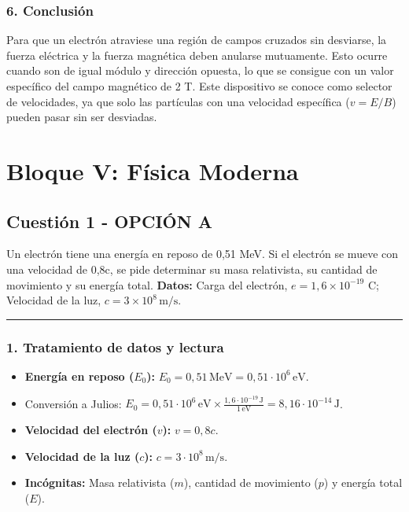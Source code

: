 \subsubsection*{6. Conclusión}
\begin{cajaconclusion}
Para que un electrón atraviese una región de campos cruzados sin desviarse, la fuerza eléctrica y la fuerza magnética deben anularse mutuamente. Esto ocurre cuando son de igual módulo y dirección opuesta, lo que se consigue con un valor específico del campo magnético de 2 T. Este dispositivo se conoce como selector de velocidades, ya que solo las partículas con una velocidad específica ($v=E/B$) pueden pasar sin ser desviadas.
\end{cajaconclusion}

\newpage

\section{Bloque V: Física Moderna}
\label{sec:moderna_2000_jun_ord}

\subsection{Cuestión 1 - OPCIÓN A}
\label{subsec:5A_2000_jun_ord}

\begin{cajaenunciado}
Un electrón tiene una energía en reposo de 0,51 MeV. Si el electrón se mueve con una velocidad de 0,8c, se pide determinar su masa relativista, su cantidad de movimiento y su energía total.
\textbf{Datos:} Carga del electrón, $e=1,6\times10^{-19}$ C; Velocidad de la luz, $c=3\times10^{8}\,\text{m/s}$.
\end{cajaenunciado}
\hrule

\subsubsection*{1. Tratamiento de datos y lectura}
\begin{itemize}
    \item \textbf{Energía en reposo ($E_0$):} $E_0 = 0,51 \, \text{MeV} = 0,51 \cdot 10^6 \, \text{eV}$.
    \item Conversión a Julios: $E_0 = 0,51 \cdot 10^6 \, \text{eV} \times \frac{1,6 \cdot 10^{-19} \, \text{J}}{1 \, \text{eV}} = 8,16 \cdot 10^{-14} \, \text{J}$.
    \item \textbf{Velocidad del electrón ($v$):} $v = 0,8c$.
    \item \textbf{Velocidad de la luz ($c$):} $c = 3 \cdot 10^8 \, \text{m/s}$.
    \item \textbf{Incógnitas:} Masa relativista ($m$), cantidad de movimiento ($p$) y energía total ($E$).
\end{itemize}

